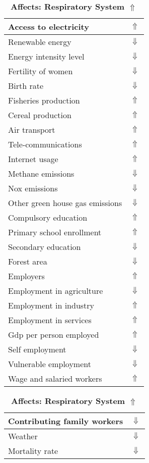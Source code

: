 \documentclass[12pt,notitlepage,oneside]{report}
\begin{document}
\begin{table}[!htb]
\caption{\textbf{Affects: Respiratory System $\Uparrow$}}
\centering
\label{Correlated Socio-economic Factors0}
\begin{tabular}{|l|l|}
\hline
Access to electricity & $\Uparrow$\\ \hline
Renewable energy & $\Downarrow$\\ \hline
Energy intensity level & $\Downarrow$\\ \hline
Fertility of women & $\Downarrow$\\ \hline
Birth rate & $\Downarrow$\\ \hline
Fisheries production & $\Uparrow$\\ \hline
Cereal production & $\Uparrow$\\ \hline
Air transport  & $\Uparrow$\\ \hline
Tele-communications & $\Uparrow$\\ \hline
Internet usage & $\Uparrow$\\ \hline
Methane emissions & $\Downarrow$\\ \hline
Nox emissions & $\Downarrow$\\ \hline
Other green house gas emissions & $\Downarrow$\\ \hline
Compulsory education & $\Uparrow$\\ \hline
Primary school enrollment & $\Uparrow$\\ \hline
Secondary education & $\Downarrow$\\ \hline
Forest area & $\Downarrow$\\ \hline
Employers & $\Uparrow$\\ \hline
Employment in agriculture & $\Downarrow$\\ \hline
Employment in industry & $\Uparrow$\\ \hline
Employment in services & $\Uparrow$\\ \hline
Gdp per person employed & $\Uparrow$\\ \hline
Self employment & $\Downarrow$\\ \hline
Vulnerable employment & $\Downarrow$\\ \hline
Wage and salaried workers & $\Uparrow$\\ \hline
\end{tabular}
\begin{tabular}{|l|l|}
\hline
Contributing family workers & $\Downarrow$\\ \hline
Weather & $\Downarrow$\\ \hline
Mortality rate & $\Downarrow$\\ \hline

\end{tabular}
\end{table}
\end{document}
